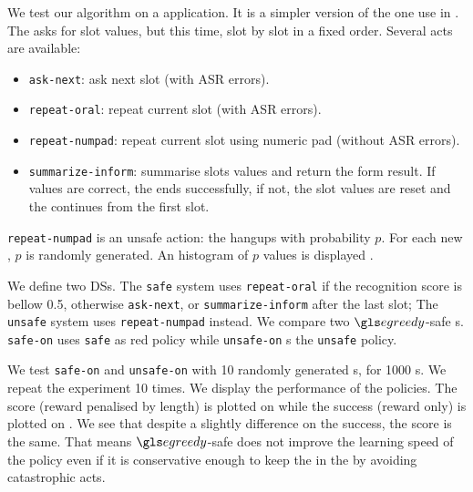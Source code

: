 We test our algorithm on a  application. It is a simpler version of the one use in . The  asks for slot values, but this time, slot by slot in a fixed order. Several acts are available:

\begin{itemize}
    \item \texttt{ask-next}: ask next slot (with \gls{ASR} errors).
    \item \texttt{repeat-oral}: repeat current slot (with \gls{ASR} errors).
    \item \texttt{repeat-numpad}: repeat current slot using numeric pad (without \gls{ASR} errors).
    \item \texttt{summarize-inform}: summarise slots values and return the form result. If values are correct, the  ends successfully, if not, the slot values are reset and the  continues from the first slot.
\end{itemize}

\texttt{repeat-numpad} is an unsafe action: the  hangups with probability $p$. For each new , $p$ is randomly generated. An histogram of $p$ values is displayed .

We define two  \glspl{DS}. The \texttt{safe} system uses \texttt{repeat-oral} if the recognition score is bellow 0.5, otherwise \texttt{ask-next}, or \texttt{summarize-inform} after the last slot; The \texttt{unsafe} system uses \texttt{repeat-numpad} instead. We compare two $\egreedy$-safe s. \texttt{safe-on} uses \texttt{safe} as red policy while \texttt{unsafe-on} s the \texttt{unsafe} policy.


We test \texttt{safe-on} and \texttt{unsafe-on} with 10 randomly generated s, for 1000 s. We repeat the experiment 10 times. We display the performance of the  policies. The  score (reward penalised by  length) is plotted on  while the  success (reward only) is plotted on . We see that despite a slightly difference on the  success, the  score is the same. That means $\egreedy$-safe does not improve the learning speed of the  policy even if it is conservative enough to keep the  in the  by avoiding catastrophic acts.
%

